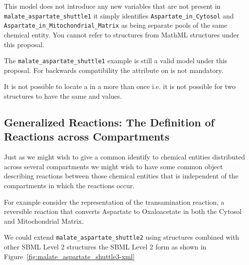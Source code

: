 \documentclass{cekarticle}
\begin{document}
This model does not introduce any new variables that are not present in
\texttt{malate\_aspartate\_shuttle1} it simply identifies \texttt{Aspartate\_in\_Cytosol}
and \texttt{Aspartate\_in\_Mitochondrial\_Matrix} as being separate pools of the same chemical entity.
You cannot refer to  structures from MathML structures under this proposal.

The \texttt{malate\_aspartate\_shuttle1} example is still a valid model under this proposal.
For backwards compatibility the  attribute on  is not
mandatory.

It is not possible to locate a  in a  more than once
i.e. it is not possible for two  structures to have the same
 and  values.

\subsection{Generalized Reactions: The Definition of Reactions across Compartments}
\label{sec:commonreaction}

Just as we might wish to give a common identify to chemical entities distributed across several
compartments we might wish to have some common object describing reactions between those chemical
entities that is independent of the compartments in which the reactions occur.

For example consider the representation of the transamination reaction, a reversible reaction
that converts Aspartate to Oxaloacetate in both the Cytosol and Mitochondrial Matrix.

We could extend \texttt{malate\_aspartate\_shuttle2} using  structures
combined with other SBML Level 2 structures the SBML Level 2 form as shown in
Figure~\ref{fig:malate_aspartate_shuttle3-xml}
\end{document}
